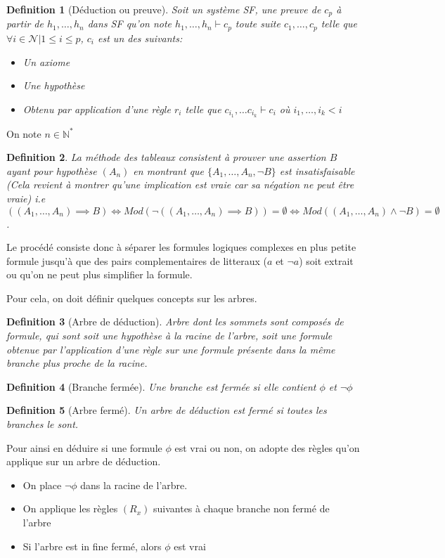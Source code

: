 \documentclass{paper}
\newtheorem{defi}{Definition}
\begin{document}
\begin{defi}[Déduction ou preuve]
    Soit un système SF, une preuve de $c_p$ à partir de $h_1,\dots,h_n$ dans SF qu'on note $h_1,\dots, h_n \vdash c_p$
    toute suite $c_1,\dots,c_p$ telle que $\forall i\in\mathcal{N} | 1 \leq i \leq p$, $c_i$ est un des suivants:
    \begin{itemize}
        \item Un axiome
        \item Une hypothèse
        \item Obtenu par application d'une règle $r_i$ telle que $c_{i_1},\dots c_{i_k} \vdash c_i$ où $ i_1,\dots,i_k < i$
    \end{itemize}
\end{defi}
On note $n\in\mathbb{N}^*$
\begin{defi}
    \textit{La méthode des tableaux} consistent à prouver une assertion $B$ ayant pour hypothèse $(A_n)$ en montrant
    que $\{A_1,\dots,A_n, \lnot B\}$ est insatisfaisable (Cela revient à montrer qu'une implication est vraie car sa négation ne peut être vraie)
    i.e $((A_1,\dots,A_n)\implies B) \Leftrightarrow Mod(\lnot((A_1,\dots,A_n)\implies B)) = \emptyset \Leftrightarrow Mod((A_1,\dots,A_n)\land \lnot B) = \emptyset$.
\end{defi}

Le procédé consiste donc à séparer les formules logiques complexes en plus petite formule jusqu'à que des pairs complementaires de litteraux ($a$ et $\lnot a$) soit extrait ou qu'on ne peut plus simplifier la formule.

Pour cela, on doit définir quelques concepts sur les arbres.

\begin{defi}[Arbre de déduction]
    Arbre dont les sommets sont composés de formule, qui sont soit une hypothèse à la racine de l'arbre, soit une formule obtenue par l'application d'une règle sur une formule présente dans la même branche plus proche de la racine.
\end{defi}

\begin{defi}[Branche fermée]
    Une branche est fermée si elle contient $\phi$ et $\lnot\phi$
\end{defi}

\begin{defi}[Arbre fermé]
    Un arbre de déduction est fermé si toutes les branches le sont.
\end{defi}

Pour ainsi en déduire si une formule $\phi$ est vrai ou non, on adopte des règles qu'on applique sur un arbre de déduction.
\begin{itemize}
    \item On place $\lnot\phi$ dans la racine de l'arbre.
    \item On applique les règles $(R_x)$ suivantes à chaque branche non fermé de l'arbre
    \item Si l'arbre est in fine fermé, alors $\phi$ est vrai
\end{itemize}
\end{document}
